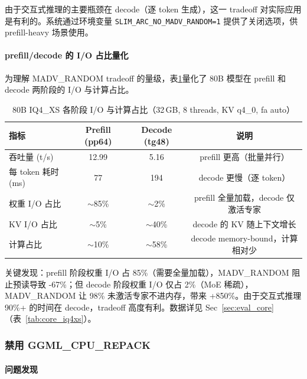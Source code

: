 由于交互式推理的主要瓶颈在 decode（逐 token 生成），这一 tradeoff 对实际应用是有利的。系统通过环境变量 \texttt{SLIM\_ARC\_NO\_MADV\_RANDOM=1} 提供了关闭选项，供 prefill-heavy 场景使用。

\paragraph{prefill/decode 的 I/O 占比量化}

为理解 MADV\_RANDOM tradeoff 的量级，表\ref{tab:prefill_decode_io}量化了 80B 模型在 prefill 和 decode 两阶段的 I/O 与计算占比。

\begin{table}[H]
    \centering
    \caption{80B IQ4\_XS 各阶段 I/O 与计算占比（32\,GB, 8 threads, KV q4\_0, fa auto）}
    \label{tab:prefill_decode_io}
    \begin{tabular}{lccc}
        \toprule
        \textbf{指标} & \textbf{Prefill (pp64)} & \textbf{Decode (tg48)} & \textbf{说明} \\
        \midrule
        吞吐量 (t/s) & 12.99 & 5.16 & prefill 更高（批量并行） \\
        每 token 耗时 (ms) & 77 & 194 & decode 更慢（逐 token） \\
        权重 I/O 占比 & $\sim$85\% & $\sim$2\% & prefill 全量加载，decode 仅激活专家 \\
        KV I/O 占比 & $\sim$5\% & $\sim$40\% & decode 的 KV 随上下文增长 \\
        计算占比 & $\sim$10\% & $\sim$58\% & decode memory-bound，计算相对少 \\
        \bottomrule
    \end{tabular}
\end{table}

关键发现：prefill 阶段权重 I/O 占 85\%（需要全量加载），MADV\_RANDOM 阻止预读导致 -67\%；但 decode 阶段权重 I/O 仅占 2\%（MoE 稀疏），MADV\_RANDOM 让 98\% 未激活专家不进内存，带来 +850\%。由于交互式推理 90\%+ 的时间在 decode，tradeoff 高度有利。数据详见 Sec~\ref{sec:eval_core}（表~\ref{tab:core_iq4xs}）。

\subsubsection{禁用 GGML\_CPU\_REPACK}

\paragraph{问题发现}

